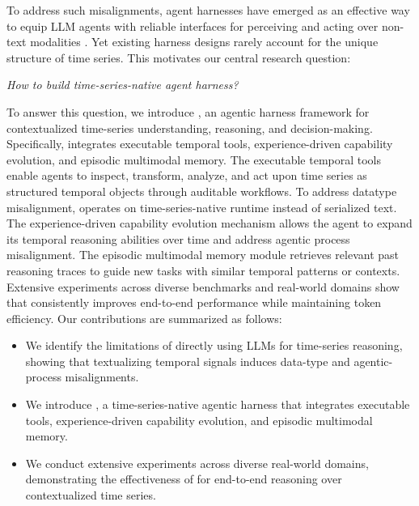 To address such misalignments, agent harnesses have emerged as an effective way to equip LLM agents with reliable interfaces for perceiving and acting over non-text modalities \citep{meng2026agent, ning2026code}. Yet existing harness designs rarely account for the unique structure of time series.
This motivates our central research question:
\begin{center}
\textit{How to build time-series-native agent harness?}
\end{center}


To answer this question, we introduce \method, an agentic harness framework for contextualized time-series understanding, reasoning, and decision-making. Specifically, \method integrates executable temporal tools, experience-driven capability evolution, and episodic multimodal memory.
The executable temporal tools enable agents to inspect, transform, analyze, and act upon time series as structured temporal objects through auditable workflows. To address datatype misalignment, \method operates on time-series-native runtime instead of serialized text. The experience-driven capability evolution mechanism allows the agent to expand its temporal reasoning abilities over time and address agentic process misalignment. The episodic multimodal memory module retrieves relevant past reasoning traces to guide new tasks with similar temporal patterns or contexts. 
Extensive experiments across diverse benchmarks and real-world domains show that \method consistently improves end-to-end performance while maintaining token efficiency.
Our contributions are summarized as follows:

\begin{itemize}

\item We identify the limitations of directly using LLMs for time-series reasoning, showing that textualizing temporal signals induces data-type and agentic-process misalignments.

\item We introduce \method, a time-series-native agentic harness that integrates executable tools, experience-driven capability evolution, and episodic multimodal memory.

\item We conduct extensive experiments across diverse real-world domains, demonstrating the effectiveness of \method for end-to-end reasoning over contextualized time series.

\end{itemize}